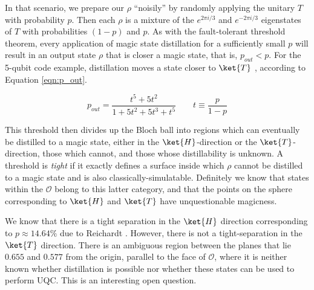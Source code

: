 In that scenario, we prepare our $\rho$ ``noisily'' by
randomly applying the unitary $T$ with probability $p$.
Then each $\rho$ is a mixture of the $e^{2\pi i / 3}$ and
$e^{-2\pi i / 3}$ eigenstates of $T$ with probabilities $(1-p)$ and $p$.
As with the fault-tolerant
threshold theorem, every application of magic state distillation for a
sufficiently small $p$ will result in an output state $\rho$ that is closer
a magic state, that is, $p_{out} < p$. For the 5-qubit code example,
distillation moves a state
closer to $\ket{T}$ , according to Equation
\ref{eqn:p_out}.

\begin{equation}
p_{out} = \frac{t^5 + 5t^2}{1 + 5t^2 + 5t^3 + t^5} \qquad t \equiv \frac{p}{1-p}
\label{eqn:p_out}
\end{equation}

This threshold then divides up the Bloch ball into regions which can eventually
be distilled to a magic state, either in the $\ket{H}$-direction or the
$\ket{T}$-direction, those which cannot, and those whose distillability is unknown.
A threshold is \emph{tight}
if it exactly defines a surface inside which $\rho$ cannot be distilled to
a magic state and is also classically-simulatable. Definitely
we know that states within the $\mathcal{O}$ belong to this
latter category, and that the points on the sphere corresponding to
$\ket{H}$ and $\ket{T}$ have unquestionable magicness.

We know that there is a tight separation in the $\ket{H}$ direction 
corresponding to $p \approx 14.64\%$ due to Reichardt \cite{Reichardt2004}.
However, there is not a tight-separation in the $\ket{T}$ direction. There
is an ambiguous region between the planes that lie $0.655$ and $0.577$
from the origin, parallel to the face of $\mathcal{O}$, where it is neither
known whether distillation is possible nor whether these states can be used
to perform \textsf{UQC}. This is an interesting open question.



